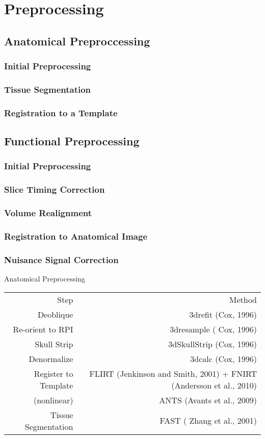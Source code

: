 \section*{Preprocessing}
\subsection{Anatomical Preproccessing}
\subsubsection{Initial Preprocessing}
\subsubsection{Tissue Segmentation}
\subsubsection{Registration to a Template}
\subsection{Functional Preprocessing}
\subsubsection{Initial Preprocessing}
\subsubsection{Slice Timing Correction}
\subsubsection{Volume Realignment}
\subsubsection{Registration to Anatomical Image}
\subsubsection{Nuisance Signal Correction}

Anatomical Preprocessing \\

\begin{tabular}{r r}
	\hline
	Step & Method  \\
	Deoblique & 3drefit (Cox, 1996)  \\
	Re-orient to RPI & 3dresample ( Cox, 1996) \\
	Skull Strip & 3dSkullStrip (Cox, 1996) \\
	Denormalize & 3dcalc (Cox, 1996) \\
	Register to Template & FLIRT (Jenkinson and Smith, 2001) + FNIRT (Andersson et al., 2010) \\
	(nonlinear) & ANTS (Avants et al., 2009)  \\
	Tissue Segmentation & FAST ( Zhang et al., 2001)\\ 
	\hline
\end{tabular}

